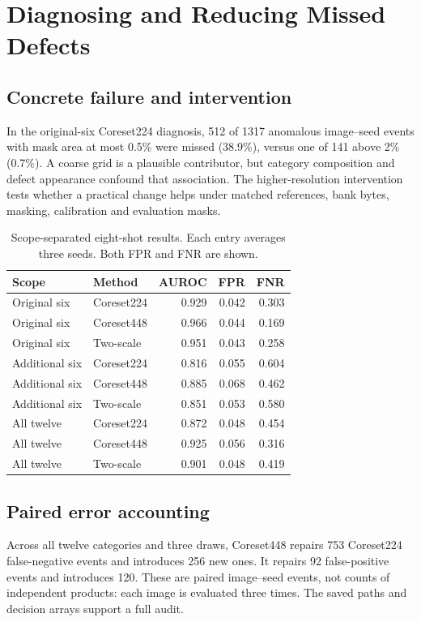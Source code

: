 \documentclass[10pt,twocolumn,letterpaper]{article}
\begin{document}
\section{Diagnosing and Reducing Missed Defects}
\subsection{Concrete failure and intervention}
In the original-six Coreset224 diagnosis, 512 of 1317 anomalous image--seed events with mask area at most 0.5\% were missed (38.9\%), versus one of 141 above 2\% (0.7\%). A coarse grid is a plausible contributor, but category composition and defect appearance confound that association. The higher-resolution intervention tests whether a practical change helps under matched references, bank bytes, masking, calibration and evaluation masks.
\begin{table}[h]\centering\scriptsize
\caption{Scope-separated eight-shot results. Each entry averages three seeds. Both FPR and FNR are shown.}
\begin{tabular}{llrrr}\toprule
Scope & Method & AUROC & FPR & FNR\\\midrule
Original six & Coreset224 & 0.929 & 0.042 & 0.303 \\
Original six & Coreset448 & 0.966 & 0.044 & 0.169 \\
Original six & Two-scale & 0.951 & 0.043 & 0.258 \\
Additional six & Coreset224 & 0.816 & 0.055 & 0.604 \\
Additional six & Coreset448 & 0.885 & 0.068 & 0.462 \\
Additional six & Two-scale & 0.851 & 0.053 & 0.580 \\
All twelve & Coreset224 & 0.872 & 0.048 & 0.454 \\
All twelve & Coreset448 & 0.925 & 0.056 & 0.316 \\
All twelve & Two-scale & 0.901 & 0.048 & 0.419 \\
\bottomrule\end{tabular}
\end{table}
\subsection{Paired error accounting}
Across all twelve categories and three draws, Coreset448 repairs 753 Coreset224 false-negative events and introduces 256 new ones. It repairs 92 false-positive events and introduces 120. These are paired image--seed events, not counts of independent products: each image is evaluated three times. The saved paths and decision arrays support a full audit.
\end{document}
